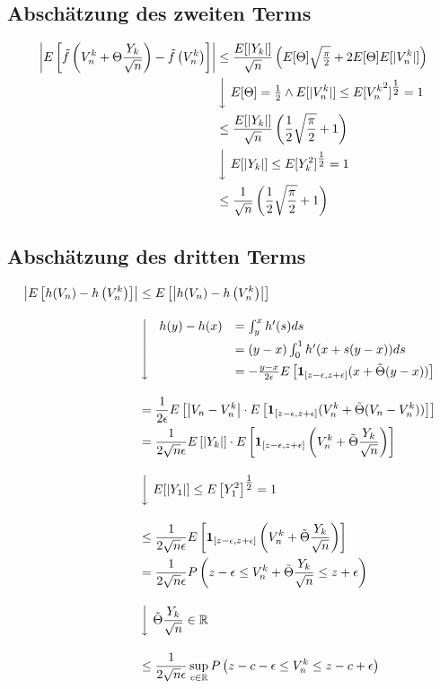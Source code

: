 \subsection{Abschätzung des zweiten Terms}

\begin{align*}
\left|E\left[\tilde f\left(V_n^k + \Theta \frac{Y_k}{\sqrt n}\right)-\tilde f\left(V_n^k\right)\right]\right| & \le \frac{E[|Y_k|]}{\sqrt n}\left(E[\Theta]\sqrt{\tfrac \pi2}+2E[\Theta]E[|V_n^k|]\right) \\
&\left\downarrow\ E[\Theta]=\tfrac 12 \land E[|V_n^k|] \le E[{V_n^k}^2]^{\tfrac 12}=1\right.\\
& \le \frac{E[|Y_k|]}{\sqrt n}\left(\frac 12\sqrt{\frac \pi2}+1\right) \\
&\left\downarrow\ E[|Y_k|] \le E[Y_k^2]^{\tfrac 12}=1\right.\\
& \le \frac{1}{\sqrt n}\left(\frac 12\sqrt{\frac \pi2}+1\right) \\
\end{align*}

\subsection{Abschätzung des dritten Terms}

\begin{align*}
\left|E\left[h(V_n)-h\left(V_n^k\right)\right]\right|&\le E\left[\left|h(V_n)-h\left(V_n^k\right)\right|\right] \\[1em]
&\left\downarrow\ \begin{array}{rl}
h(y)-h(x) & = \int_y^x h'(s) ds \\[0.5em]
&= (y-x) \int_0^1 h'(x+s(y-x))ds \\[0.5em]
&=-\frac{y-x}{2\epsilon} E\left[\mathbf{1}_{[z-\epsilon,z+\epsilon]}(x + \tilde \Theta (y-x))\right]
\end{array} \right. \\[1em]
&= \frac{1}{2\epsilon}E\left[\left|V_n-V_n^k\right|\cdot E\left[\mathbf{1}_{[z-\epsilon,z+\epsilon]}(V_n^k + \tilde \Theta (V_n-V_n^k))\right]\right] \\
&= \frac{1}{2\sqrt{n}\epsilon}E\left[\left|Y_k\right|\right]\cdot E\left[\mathbf{1}_{[z-\epsilon,z+\epsilon]}\left(V_n^k + \tilde \Theta \frac{Y_k}{\sqrt n}\right)\right] \\[1em]
&\left\downarrow\ E[|Y_1|]\le E\left[Y_1^2\right]^{\tfrac 12}=1 \right.\\[1em]
&\le \frac{1}{2\sqrt{n}\epsilon}E\left[\mathbf{1}_{[z-\epsilon,z+\epsilon]}\left(V_n^k + \tilde \Theta \frac{Y_k}{\sqrt n}\right)\right] \\
&= \frac{1}{2\sqrt{n}\epsilon}P\left(z-\epsilon \le V_n^k + \tilde \Theta \frac{Y_k}{\sqrt n} \le z+\epsilon\right) \\[1em]
&\left\downarrow\ \tilde \Theta\frac{Y_k}{\sqrt n} \in \mathbb R \right. \\[1em]
&\le \frac{1}{2\sqrt{n}\epsilon} \sup_{c\in\mathbb R} P\left(z-c-\epsilon \le V_n^k \le z-c+\epsilon\right) \\
\end{align*}

